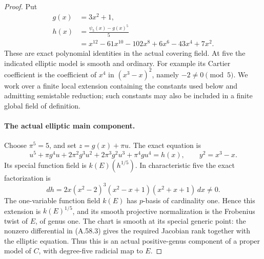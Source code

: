 \begin{proof}
Put
\[
\begin{aligned}
 g(x)&=3x^2+1,\\
 h(x)&=\frac{\psi _5(x)-g(x)^5}{5}\\
     &=x^{12}-61x^{10}-102x^8+6x^6-43x^4+7x^2.
\end{aligned}                                                   \tag{A.58.1}
\]
These are exact polynomial identities in the actual covering
field. At five the indicated elliptic model is smooth and ordinary.
For example its Cartier coefficient is the coefficient of \(x^4\)
in \((x^3-x)^2\), namely \(-2\ne0\pmod5\).
We work over a finite local extension containing the constants
used below and admitting semistable reduction; such constants
may also be included in a finite global field of definition.

\paragraph{The actual elliptic main component.}
Choose \(\pi^5=5\), and set \(z=g(x)+\pi u\). The exact equation is
\[
 u^5+\pi g^4u+2\pi^2g^3u^2+2\pi^3g^2u^3+\pi^4gu^4=h(x),
                   \qquad y^2=x^3-x.                 \tag{A.58.2}
\]
Its special function field is \(k(E)(h^{1/5})\). In
characteristic five the exact factorization is
\[
          dh=2x(x^2-2)^3(x^2-x+1)(x^2+x+1)\,dx\ne0.
                                                        \tag{A.58.3}
\]
The one-variable function field \(k(E)\) has \(p\)-basis
of cardinality one. Hence this extension is \(k(E)^{1/5}\),
and its smooth projective normalization is the Frobenius twist
of \(E\), of genus one. The chart is smooth at its special
generic point: the nonzero differential in (A.58.3) gives the
required Jacobian rank together with the elliptic equation.
Thus this is an actual positive-genus component of a proper
model of \(C\), with degree-five radicial map to \(E\).


\end{proof}
